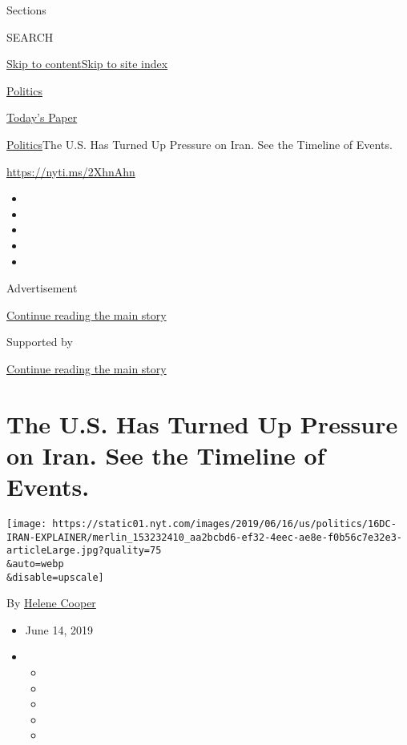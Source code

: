 Sections

SEARCH

\protect\hyperlink{site-content}{Skip to
content}\protect\hyperlink{site-index}{Skip to site index}

\href{https://www.nytimes.com/section/politics}{Politics}

\href{https://myaccount.nytimes.com/auth/login?response_type=cookie\&client_id=vi}{}

\href{https://www.nytimes.com/section/todayspaper}{Today's Paper}

\href{/section/politics}{Politics}\textbar{}The U.S. Has Turned Up
Pressure on Iran. See the Timeline of Events.

\url{https://nyti.ms/2XhnAhn}

\begin{itemize}
\item
\item
\item
\item
\item
\end{itemize}

Advertisement

\protect\hyperlink{after-top}{Continue reading the main story}

Supported by

\protect\hyperlink{after-sponsor}{Continue reading the main story}

\hypertarget{the-us-has-turned-up-pressure-on-iran-see-the-timeline-of-events}{%
\section{The U.S. Has Turned Up Pressure on Iran. See the Timeline of
Events.}\label{the-us-has-turned-up-pressure-on-iran-see-the-timeline-of-events}}

\texttt{[image: https://static01.nyt.com/images/2019/06/16/us/politics/16DC-IRAN-EXPLAINER/merlin\_153232410\_aa2bcbd6-ef32-4eec-ae8e-f0b56c7e32e3-articleLarge.jpg?quality=75\\\&auto=webp\\\&disable=upscale]}

By \href{https://www.nytimes.com/by/helene-cooper}{Helene Cooper}

\begin{itemize}
\item
  June 14, 2019
\item
  \begin{itemize}
  \item
  \item
  \item
  \item
  \item
  \end{itemize}
\end{itemize}

